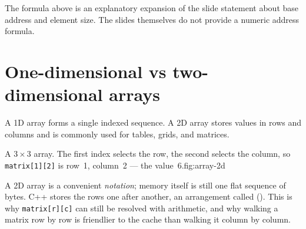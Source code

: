 \begin{clarification}
The formula above is an explanatory expansion of the slide statement about base address and element size. The slides themselves do not provide a numeric address formula.
\end{clarification}

\section{One-dimensional vs two-dimensional arrays}

A 1D array forms a single indexed sequence. A 2D array stores values in rows and columns and is commonly used for tables, grids, and matrices.

\begin{utpfig}{A $3\times3$ array. The first index selects the row, the second selects the
column, so \texttt{matrix[1][2]} is row~1, column~2 --- the value~6.}{fig:array-2d}
\end{utpfig}

\begin{clarification}
A 2D array is a convenient \emph{notation}; memory itself is still one flat sequence of
bytes. C++ stores the rows one after another, an arrangement called 
(). This is why \texttt{matrix[r][c]} can still be resolved with
arithmetic, and why walking a matrix row by row is friendlier to the cache than walking it
column by column.
\end{clarification}

